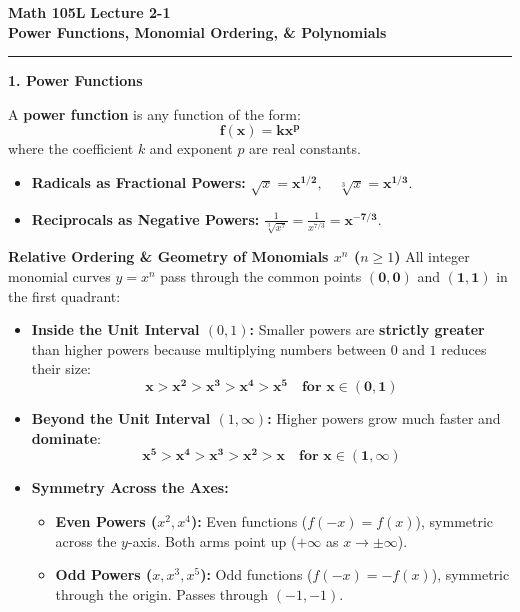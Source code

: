 \documentclass[10.5pt]{article}
\begin{document}
\noindent \textbf{\large Math 105L} \hfill \textbf{\large Lecture 2-1}\\[1pt]
{\textbf{\Large Power Functions, Monomial Ordering, \& Polynomials}}\\[-5pt]
\rule{\textwidth}{1.2pt}

\vspace{0.03in}

\textbf{\large 1. Power Functions}

A \textbf{power function} is any function of the form:
\[
  \mathbf{f(x) = k x^p}
\]
where the coefficient $k$ and exponent $p$ are real constants.
\begin{itemize}[leftmargin=1.2em, topsep=1pt, itemsep=2pt]
  \item \textbf{Radicals as Fractional Powers:} $\sqrt{x} = \mathbf{x^{1/2}}, \quad \sqrt[3]{x} = \mathbf{x^{1/3}}$.
  \item \textbf{Reciprocals as Negative Powers:} $\frac{1}{\sqrt[3]{x^7}} = \frac{1}{x^{7/3}} = \mathbf{x^{-7/3}}$.
\end{itemize}

\vspace{0.03in}

\begin{tcolorbox}[colback=boxbg, colframe=boxframe, boxrule=0.8pt, arc=3pt, left=8pt, right=8pt, top=4pt, bottom=4pt]
\textbf{\large Relative Ordering \& Geometry of Monomials $x^n$ ($n \ge 1$)}
All integer monomial curves $y = x^n$ pass through the common points $\mathbf{(0,0)}$ and $\mathbf{(1,1)}$ in the first quadrant:
\begin{itemize}[leftmargin=1.2em, topsep=2pt, itemsep=4pt]
  \item \textbf{Inside the Unit Interval $(0, 1)$:}
  Smaller powers are \textbf{strictly greater} than higher powers because multiplying numbers between $0$ and $1$ reduces their size:
  \[
    \mathbf{x > x^2 > x^3 > x^4 > x^5 \quad \text{for } x \in (0, 1)}
  \]
  \item \textbf{Beyond the Unit Interval $(1, \infty)$:}
  Higher powers grow much faster and \textbf{dominate}:
  \[
    \mathbf{x^5 > x^4 > x^3 > x^2 > x \quad \text{for } x \in (1, \infty)}
  \]
  \item \textbf{Symmetry Across the Axes:}
  \begin{itemize}[label=--]
    \item \textbf{Even Powers ($x^2, x^4$):} Even functions ($f(-x) = f(x)$), symmetric across the $y$-axis. Both arms point up ($+\infty$ as $x \to \pm\infty$).
    \item \textbf{Odd Powers ($x, x^3, x^5$):} Odd functions ($f(-x) = -f(x)$), symmetric through the origin. Passes through $(-1, -1)$.
  \end{itemize}
\end{itemize}
\end{tcolorbox}
\end{document}
